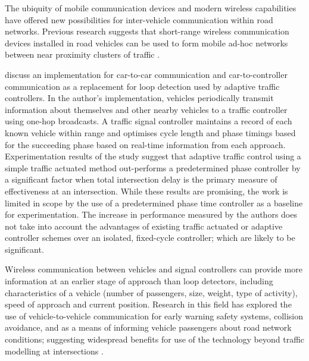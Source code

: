 The ubiquity of mobile communication devices and modern wireless capabilities have offered new possibilities for inter-vehicle communication within road networks. Previous research suggests that short-range wireless communication devices installed in road vehicles can be used to form mobile ad-hoc networks between near proximity clusters of traffic \cite{adaptive2007grad,nadeem2004trafficview,yang2004vehicle}.

 discuss an implementation for car-to-car communication and car-to-controller communication as a replacement for loop detection used by adaptive traffic controllers. In the author's implementation, vehicles periodically transmit information about themselves and other nearby vehicles to a traffic controller using one-hop broadcasts. A traffic signal controller maintains a record of each known vehicle within range and optimises cycle length and phase timings based for the succeeding phase based on real-time information from each approach. Experimentation results of the study suggest that adaptive traffic control using a simple traffic actuated method out-performs a predetermined phase controller by a significant factor when total intersection delay is the primary measure of effectiveness at an intersection. While these results are promising, the work is limited in scope by the use of a predetermined phase time controller as a baseline for experimentation. The increase in performance measured by the authors does not take into account the advantages of existing traffic actuated or adaptive controller schemes over an isolated, fixed-cycle controller; which are likely to be significant. 

Wireless communication between vehicles and signal controllers can provide more information at an earlier stage of approach than loop detectors, including characteristics of a vehicle (number of passengers, size, weight, type of activity), speed of approach and current position. Research in this field has explored the use of vehicle-to-vehicle communication for early warning safety systems, collision avoidance, and as a means of informing vehicle passengers about road network conditions; suggesting widespread benefits for use of the technology beyond traffic modelling at intersections \cite{nadeem2004trafficview,yang2004vehicle}.









